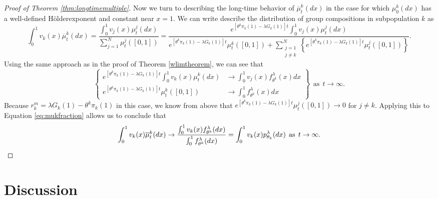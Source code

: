 \documentclass[11pt]{article}
\numberwithin{equation}{section}
\newcommand{\ds}{\displaystyle}
\newcommand{\ol}{\overline}
\newcommand{\holder}{H{\"o}lder\:}
\begin{document}
{\begin{proof}[Proof of Theorem \ref{thm:longtimemultiple}]
Now we turn to describing the long-time behavior of $\ol{\mu}_t^k(dx)$ in the case for which $\mu_0^k(dx)$ has a well-defined \holder exponent and constant near $x = 1$. We can write describe the distribution of group compositions in subpopulation $k$ as
\begin{equation} \label{eq:mukfraction}
   \int_0^1 v_k(x) \ol{\mu}_t^k(dx) = \frac{\int_0^1 v_j(x) \mu_t^j(dx)}{ \ds\sum_{j=1}^N \mu_t^j \left([0,1] \right)} =  \frac{e^{\left[\theta^k \pi_k(1) - \lambda G_k(1)\right]t}\int_0^1 v_j(x) \mu_t^j(dx)}{e^{\left[\theta^k \pi_k(1) - \lambda G_k(1)\right]t} \mu_t^k\left([0,1]\right) + \ds\sum_{\substack{j = 1 \\j \ne k}}^N \left\{e^{\left[\theta^k \pi_k(1) - \lambda G_k(1)\right]t} \mu_t^j\left([0,1]\right) \right\}}.
\end{equation}
Using the same approach as in the proof of Theorem \ref{wlimtheorem}, we can see that 
\begin{equation}
\left\{
     \begin{array}{cl}
     e^{\left[\theta^k \pi_k(1) - \lambda G_k(1)\right]t}\int_0^1 v_k(x) \mu_t^k(dx) & \to \int_0^1 v_j(x) f^{\lambda}_{\theta^k}(x) dx \\
     e^{\left[\theta^k \pi_k(1) - \lambda G_k(1)\right]t} \mu_t^k\left([0,1]\right) &\to \int_0^1 f^{\lambda}_{\theta^k}(x) dx
    \end{array}  \right\} \: \: \mathrm{as} \: \: t \to \infty.
    \end{equation}
Because $r_k^m = \lambda G_k(1) - \theta^k \pi_k(1)$ in this case, we know from above that $e^{\left[\theta^k \pi_k(1) - \lambda G_k(1)\right]t} \mu_t^j\left([0,1]\right) \to 0$ for $j \ne k$. Applying this to Equation \eqref{eq:mukfraction} allows us to conclude that 
\begin{equation} \label{eq:muklimit}
   \int_0^1 v_k(x) \ol{\mu}_t^k(dx) \to \frac{\int_0^1 v_k(x) f^{\lambda}_{\theta^k}(dx)}{\int_0^1  f^{\lambda}_{\theta^k}(dx)} = \int_0^1 v_k(x) p^{\lambda}_{\theta_k}(dx) \: \: \mathrm{as} \: \: t \to \infty.  \qedhere
   \end{equation}
\end{proof}



\section{Discussion} \label{sec:discussion}

}
\end{document}
